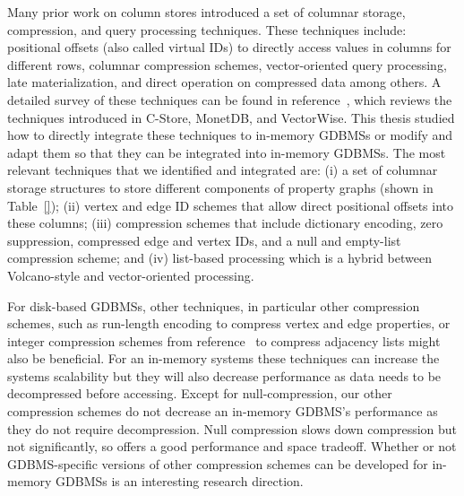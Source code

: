 Many prior work on column stores introduced a set of columnar storage, compression, and query processing techniques. These techniques include: positional offsets (also called virtual IDs) to directly access values in columns for different rows, columnar compression schemes, vector-oriented query processing, late materialization, and direct operation on compressed data among others. A detailed survey of these techniques can be found in reference~\cite{abadi-survey}, which reviews the techniques introduced in C-Store, MonetDB, and VectorWise.  This thesis studied how to directly integrate these techniques to in-memory GDBMSs or modify and adapt them so that they can be integrated into in-memory GDBMSs. The most relevant techniques that we identified and integrated are:  (i) a set of columnar storage structures to store different components of property graphs (shown in Table~\ref{}); (ii) vertex and edge ID schemes that allow direct positional offsets into these columns; (iii) compression schemes that include dictionary encoding, zero suppression, compressed edge and vertex IDs, and a null and empty-list compression scheme;  and (iv) list-based processing which is a hybrid between Volcano-style and vector-oriented processing. 

For disk-based GDBMSs, other techniques, in particular other compression schemes, such as run-length encoding to compress vertex and edge properties, or integer compression schemes from reference~\cite{lemire} to compress adjacency lists might also be beneficial. For an in-memory systems these techniques can increase the systems scalability but they will also decrease performance as data needs to be decompressed before accessing. Except for null-compression, our other compression schemes do not decrease an in-memory GDBMS's performance as they do not require decompression. Null compression slows down compression but not significantly, so offers a good performance and space tradeoff. Whether or not GDBMS-specific versions of other compression schemes can be developed for in-memory GDBMSs is an interesting research direction.


